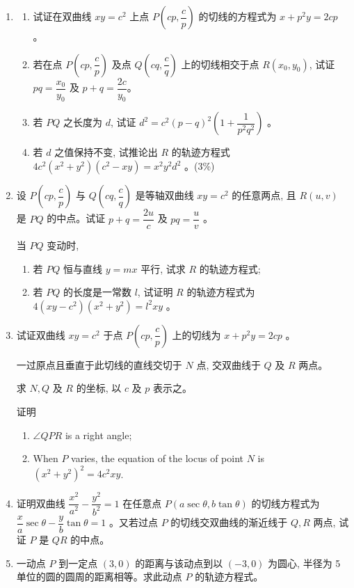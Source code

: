 \documentclass[10pt]{article}
\begin{document}
\begin{enumerate}
  \item \begin{enumerate}
    \item 试证在双曲线 $x y=c^{2}$ 上点 $P\left(c p, \dfrac{c}{p}\right)$ 的切线的方程式为 $x+p^{2} y=2 c p$ 。
    \item 若在点 $P\left(c p, \dfrac{c}{p}\right)$ 及点 $Q\left(c q, \dfrac{c}{q}\right)$ 上的切线相交于点 $R\left(x_{0}, y_{0}\right)$, 试证 $p q=\dfrac{x_{0}}{y_{0}}$ 及 $p+q=\dfrac{2 c}{y_{0}} 。$
    \item 若 $PQ$ 之长度为 $d$, 试证 $d^{2}=c^{2}(p-q)^{2}\left(1+\dfrac{1}{p^{2} q^{2}}\right)$ 。
    \item 若 $d$ 之值保持不变, 试推论出 $R$ 的轨迹方程式 $4 c^{2}\left(x^{2}+y^{2}\right)\left(c^{2}-x y\right)=x^{2} y^{2} d^{2}$ 。(3\%)
  \end{enumerate}
  \item 设 $P\left(c p, \dfrac{c}{p}\right)$ 与 $Q\left(c q, \dfrac{c}{q}\right)$ 是等轴双曲线 $x y=c^{2}$ 的任意两点, 且 $R(u, v)$ 是 $PQ$ 的中点。试证 $p+q=\dfrac{2 u}{c}$ 及 $p q=\dfrac{u}{v}$ 。

  当 $PQ$ 变动时,

\begin{enumerate}
  \item 若 $PQ$ 恒与直线 $y=m x$ 平行, 试求 $R$ 的轨迹方程式;
  \item 若 $PQ$ 的长度是一常数 $l$, 试证明 $R$ 的轨迹方程式为 $4\left(x y-c^{2}\right)\left(x^{2}+y^{2}\right)=l^{2} x y$ 。
\end{enumerate}

  \item 试证双曲线 $x y=c^{2}$ 于点 $P\left(c p, \dfrac{c}{p}\right)$ 上的切线为 $x+p^{2} y=2 c p$ 。

  一过原点且垂直于此切线的直线交切于 $N$ 点, 交双曲线于 $Q$ 及 $R$ 两点。

  求 $N, Q$ 及 $R$ 的坐标, 以 $c$ 及 $p$ 表示之。

  证明 
  
  \begin{enumerate}
    \item $\angle QPR$ is a right angle;
    \item When $P$ varies, the equation of the locus of point $N$ is $\left(x^{2}+y^{2}\right)^{2}=4 c^{2} x y$.
  \end{enumerate}

  \item 证明双曲线 $\dfrac{x^{2}}{a^{2}}-\dfrac{y^{2}}{b^{2}}=1$ 在任意点 $P(a \sec \theta, b \tan \theta)$ 的切线方程式为 $\dfrac{x}{a} \sec \theta-\dfrac{y}{b} \tan \theta=1$ 。又若过点 $P$ 的切线交双曲线的渐近线于 $Q, R$ 两点, 试证 $P$ 是 $QR$ 的中点。
  \item 一动点 $P$ 到一定点 $(3,0)$ 的距离与该动点到以 $(-3,0)$ 为圆心, 半径为 5 单位的圆的圆周的距离相等。求此动点 $P$ 的轨迹方程式。
  

\end{enumerate}
\end{document}
